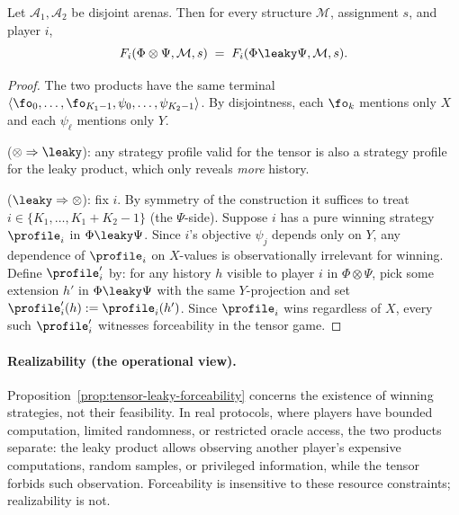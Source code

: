 \begin{proposition}
\label{prop:tensor-leaky-forceability}
Let $\mathcal A_1, \mathcal A_2$ be disjoint arenas. Then for every 
structure $\mathcal M$, assignment $s$, and player $i$,
\[
F_i(\Phi \otimes \Psi, \mathcal M, s)
\;=\;
F_i(\Phi \leaky \Psi, \mathcal M, s).
\]
\end{proposition}
\begin{proof}
The two products have the same terminal
$\langle \fo_0,\dots,\fo_{K_1-1},\psi_0,\dots,\psi_{K_2-1}\rangle$.
By disjointness, each $\fo_k$ mentions only $X$ and each $\psi_\ell$
mentions only $Y$.

($\otimes \Rightarrow \leaky$): any strategy profile valid for the tensor is
also a strategy profile for the leaky product, which only reveals \emph{more}
history.

($\leaky \Rightarrow \otimes$): fix $i$.
By symmetry of the construction it suffices to treat
$i \in \{K_1,\dots,K_1{+}K_2{-}1\}$ (the $\Psi$-side).
Suppose $i$ has a pure winning strategy $\profile_i$ in $\Phi \leaky \Psi$.
Since $i$'s objective $\psi_j$ depends only on $Y$, any dependence of
$\profile_i$ on $X$-values is observationally irrelevant for winning.
Define $\profile_i'$ by: for any history $h$ visible to player $i$ in 
$\Phi \otimes \Psi$, pick some extension $h'$ in $\Phi \leaky \Psi$ with 
the same $Y$-projection and set $\profile_i'(h) := \profile_i(h')$. Since 
$\profile_i$ wins regardless of $X$, every such $\profile_i'$ witnesses
forceability in the tensor game.
\end{proof}

\paragraph{Realizability (the operational view).}
Proposition~\ref{prop:tensor-leaky-forceability} concerns the existence
of winning strategies, not their feasibility. In real protocols, where
players have bounded computation, limited randomness, or restricted
oracle access, the two products separate: the leaky product allows
observing another player's expensive computations, random samples, or
privileged information, while the tensor forbids such observation.
Forceability is insensitive to these resource constraints; realizability
is not.

